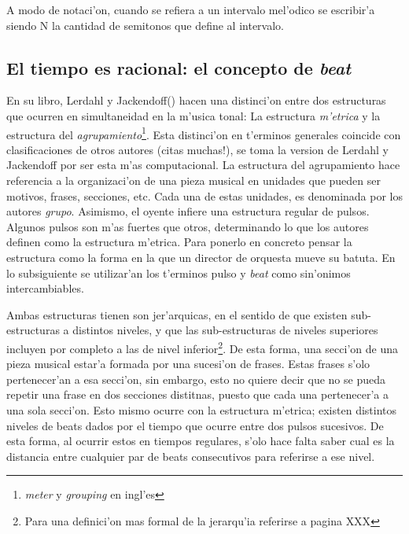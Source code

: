 A modo de notaci'on, cuando se refiera a un intervalo mel'odico se escribir'a  siendo N la cantidad de semitonos que define al intervalo. 


\subsection{El tiempo es racional: el concepto de \emph{beat}}
\newline
En su libro, Lerdahl y Jackendoff(\cite{LerdahlJackendoff83}) hacen una distinci'on entre dos estructuras que ocurren en simultaneidad en la m'usica tonal:
La estructura \emph{m'etrica} y la estructura del \emph{agrupamiento}\footnote{\emph{meter} y \emph{grouping} en ingl'es}. 
Esta distinci'on en t'erminos generales coincide con clasificaciones de otros autores (\alert{citas muchas!}), se toma la version de Lerdahl y Jackendoff 
por ser esta m'as computacional.
La estructura del agrupamiento hace referencia a la organizaci'on de una pieza musical en unidades que pueden ser motivos, frases, secciones, etc. 
Cada una de estas unidades, es denominada por los autores \emph{grupo}. Asimismo, el oyente infiere una estructura regular de pulsos. 
Algunos pulsos son m'as fuertes que otros, determinando lo que los autores definen como la estructura m'etrica. 
Para ponerlo en concreto pensar la estructura como la forma en la que un director de orquesta mueve su batuta. 
En lo subsiguiente se utilizar'an los t'erminos pulso y \emph{beat} como sin'onimos intercambiables.

Ambas estructuras tienen son jer'arquicas, en el sentido de que existen sub-estructuras a distintos niveles, y que las sub-estructuras de niveles superiores 
incluyen por completo a las de nivel inferior\footnote{Para una definici'on mas formal de la jerarqu'ia referirse a \cite{LerdahlJackendoff83} pagina \alert{XXX}}. De esta forma, una secci'on
de una pieza musical estar'a formada por una sucesi'on de frases. Estas frases s'olo pertenecer'an a esa secci'on, sin embargo, esto no quiere decir
que no se pueda repetir una frase en dos secciones distitnas, puesto que cada una pertenecer'a a una sola secci'on. 
Esto mismo ocurre con la estructura m'etrica; existen distintos niveles de beats dados por el tiempo que ocurre entre dos pulsos sucesivos. De esta forma, al 
ocurrir estos en tiempos regulares, s'olo hace falta saber cual es la distancia entre cualquier par de beats consecutivos para referirse a ese nivel. 

